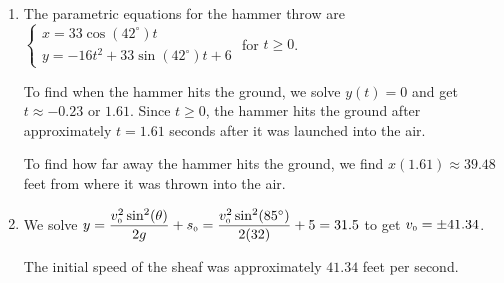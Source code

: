 \documentclass{ximera}
\begin{document}
\begin{enumerate} 
\setcounter{enumi}{\value{HW}}

\item  The parametric equations for the hammer throw are ${\displaystyle \left\{ \begin{array}{l} x = 33 \cos(42^{\circ}) t \\ [4pt] y =-16t^2 +  33 \sin(42^{\circ}) t + 6 \end{array} \right.}$ for $t \geq 0$.  

\smallskip

To find when the hammer hits the ground, we solve $y(t) = 0$ and get $t \approx -0.23$ or $1.61$.  Since $t \geq 0$, the hammer hits the ground after approximately $t = 1.61$ seconds after it was launched into the air.  

\smallskip

To find how far away the hammer hits the ground, we find $x(1.61) \approx 39.48$ feet from where it was thrown into the air.

\addtocounter{enumi}{1}

\item  We solve $y = \dfrac{v_{\text{\tiny$0$}}^2 \sin^{2}(\theta)}{2g} + s_{\text{\tiny $0$}}  = \dfrac{v_{\text{\tiny$0$}}^2 \sin^{2}(85^{\circ})}{2(32)} + 5 = 31.5$ to get $v_{\text{\tiny$0$}} = \pm 41.34$.  

\smallskip

The initial speed of the sheaf was approximately $41.34$ feet per second.

\setcounter{HW}{\value{enumi}}
\end{enumerate}
\end{document}

